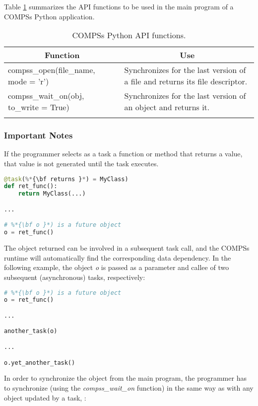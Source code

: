 Table \ref{tab:python_api_functions} summarizes the API functions to be used in the main program of a COMPSs Python application.
\bgroup
  \def\arraystretch{1.5}%
  \begin{longtable}{| p{} | p{} |}
    \hline
    \multicolumn{1}{|c|}{{\bf Function }}    &  \multicolumn{1}{c|}{{\bf Use }}\\
    \hline
    compss\_open(file\_name, mode = 'r') & Synchronizes for the last version of a file and returns its file descriptor. \\
    \hline
    compss\_wait\_on(obj, to\_write = True) & Synchronizes for the last version of an object and returns it. \\
    \hline
    \caption{COMPSs Python API functions.}
    \label{tab:python_api_functions}
  \end{longtable}
\egroup

\subsubsection{Important Notes}

If the programmer selects as a task a function or method that returns a value, that value is not 
generated until the task executes. 

\begin{lstlisting}[language=python]
@task(%*{\bf returns }*) = MyClass)
def ret_func():
    return MyClass(...)

...

# %*{\bf o }*) is a future object
o = ret_func()
\end{lstlisting}

The object returned can be involved in a subsequent task call, and the COMPSs runtime will automatically 
find the corresponding data dependency. In the following example, the object \textit{o} is passed as a parameter 
and callee of two subsequent (asynchronous) tasks, respectively:

\begin{lstlisting}[language=python]
# %*{\bf o }*) is a future object
o = ret_func()

...

another_task(o)

...

o.yet_another_task()
\end{lstlisting}

In order to synchronize the object from the main program, the programmer has to synchronize (using the \textit{compss\_wait\_on} function) in the same way 
as with any object updated by a task, :

